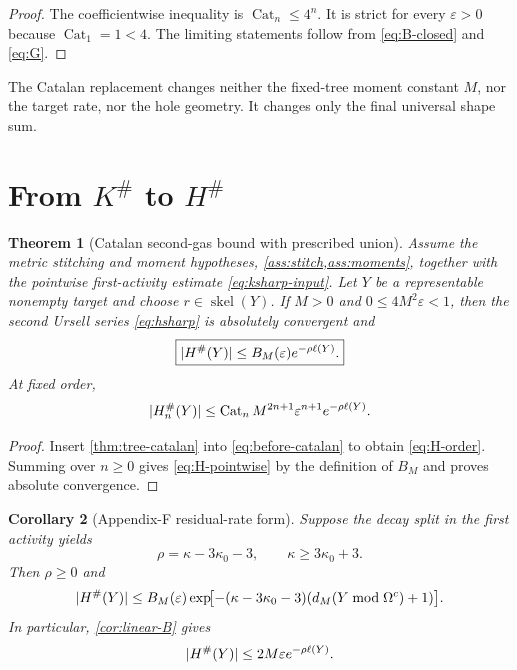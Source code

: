 \documentclass[11pt,a4paper]{article}
\newtheorem{theorem}{Theorem}[section]
\newtheorem{corollary}[theorem]{Corollary}
\theoremstyle{definition}
\newcommand{\skel}{\operatorname{skel}}
\newcommand{\Cat}{\operatorname{Cat}}
\newcommand{\eps}{\varepsilon}
\newcommand{\Hsharp}{H^{\#}}
\newcommand{\Ksharp}{K^{\#}}
\DeclarePairedDelimiter{\abs}{\lvert}{\rvert}
\begin{document}
\begin{proof}
The coefficientwise inequality is $\Cat_n\le4^n$.  It is strict for every $\eps>0$
because $\Cat_1=1<4$.  The limiting statements follow from \eqref{eq:B-closed} and
\eqref{eq:G}.
\end{proof}

The Catalan replacement changes neither the fixed-tree moment constant $M$, nor the
target rate, nor the hole geometry.  It changes only the final universal shape sum.

\section{From \texorpdfstring{$\Ksharp$}{K-sharp} to \texorpdfstring{$\Hsharp$}{H-sharp}}
\label{sec:k-to-h}

\begin{theorem}[Catalan second-gas bound with prescribed union]
\label{thm:k-to-h}
Assume the metric stitching and moment hypotheses, \cref{ass:stitch,ass:moments},
together with the pointwise first-activity estimate \eqref{eq:ksharp-input}.  Let $Y$
be a representable nonempty target and choose
$r\in\skel(Y)$.  If $M>0$ and $0\le4M^2\eps<1$, then the second Ursell series
\eqref{eq:hsharp} is absolutely convergent and
\begin{equation}
  \boxed{
  \abs{\Hsharp(Y)}\le B_M(\eps)e^{-\rho\ell(Y)}.}
  \label{eq:H-pointwise}
\end{equation}
At fixed order,
\begin{equation}
  \abs{\Hsharp_n(Y)}
  \le \Cat_nM^{2n+1}\eps^{n+1}e^{-\rho\ell(Y)}.
  \label{eq:H-order}
\end{equation}
\end{theorem}

\begin{proof}
Insert \cref{thm:tree-catalan} into \eqref{eq:before-catalan} to obtain
\eqref{eq:H-order}.  Summing over $n\ge0$ gives \eqref{eq:H-pointwise} by the
definition of $B_M$ and proves absolute convergence.
\end{proof}

\begin{corollary}[Appendix-F residual-rate form]
\label{cor:appendix-f-rate}
Suppose the decay split in the first activity yields
\[
  \rho=\kappa-3\kappa_0-3,
  \qquad \kappa\ge3\kappa_0+3.
\]
Then $\rho\ge0$ and
\[
  \abs{\Hsharp(Y)}
  \le B_M(\eps)
      \exp\!\bigl[-(\kappa-3\kappa_0-3)
                    (d_M(Y\bmod\Omega^c)+1)\bigr].
\]
In particular, \cref{cor:linear-B} gives
\[
  \abs{\Hsharp(Y)}\le2M\eps e^{-\rho\ell(Y)}.
\]
\end{corollary}
\end{document}
